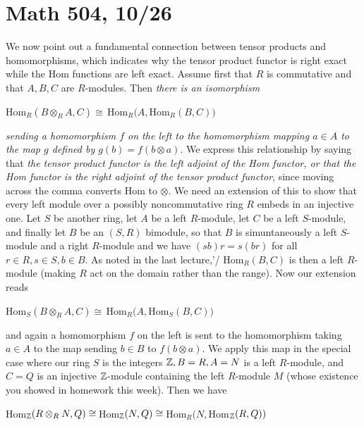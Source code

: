 \documentclass[10pt]{article}
\begin{document}
\section*{Math 504, 10/26}

We now point out a fundamental connection between tensor products and
homomorphisms, which indicates why the tensor product functor is right
exact while the Hom functions are left exact. Assume first that $R$ is
commutative and that $A,B,C$ are $R$-modules. Then {\sl there is an
  isomorphism}

Hom$_R(B\otimes_R A,C)\cong\,$Hom$_R(A,$Hom$_R(B,C))$

{\sl sending a homomorphism $f$ on the left to the homomorphism mapping
  $a\in A$ to the map $g$ defined by $g(b) = f(b\otimes a)$}. We express
this relationship by saying that {\sl the tensor product functor is the
  left adjoint of the Hom functor, or that the Hom functor is the right
  adjoint of the tensor product functor}, since moving across the comma
converts Hom to $\otimes$. We need an extension of this to show that
every left module over a possibly noncommutative ring $R$ embeds in an
injective one. Let $S$ be another ring, let $A$ be a left $R$-module,
let $C$ be a left $S$-module, and finally let $B$ be an $(S,R)$
bimodule, so that $B$ is simuntaneously a left $S$-module and a right
$R$-module and we have $(sb)r = s(br)$ for all $r\in R,s\in S,b\in B$.
As noted in the last lecture,'/ Hom$_R(B,C)$ is then a left $R$-module
(making $R$ act on the domain rather than the range). Now our extension
reads

Hom$_S(B\otimes_R A,C)\cong\,$Hom$_R(A,$Hom$_S(B,C))$

and again a homomorphism $f$ on the left is sent to the homomorphism
taking $a\in A$ to the map sending $b\in B$ to $f(b\otimes a)$. We apply
this map in the special case where our ring $S$ is the integers $\Bbb Z,
B=R, A=N$ is a left $R$-module, and $C=Q$ is an injective $\Bbb
Z$-module containing the left $R$-module $M$ (whose existence you showed
in homework this week). Then we have

Hom$_{\Bbb Z}(R\otimes_R N,Q) \cong\,$Hom$_{\Bbb
  Z}(N,Q)\cong\,$Hom$_R(N,$Hom$_{\Bbb Z} (R,Q))$
\end{document}
